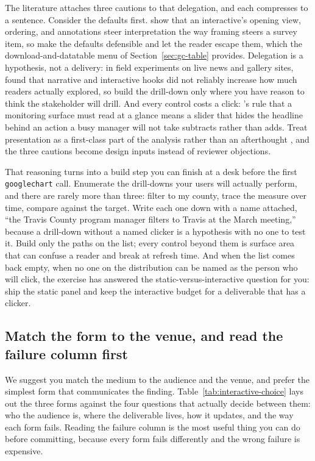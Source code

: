 \documentclass[
    a4paper,
    fontsize=10pt,
    twoside=true,
    numbers=noenddot,
]{kaobook}
\begin{document}
The literature attaches three cautions to that delegation, and each compresses to a sentence. Consider the defaults first. \textcite{hullman2011rhetoric} show that an interactive's opening view, ordering, and annotations steer interpretation the way framing steers a survey item, so make the defaults defensible and let the reader escape them, which the download-and-datatable menu of Section~\ref{sec:gc-table} provides. Delegation is a hypothesis, not a delivery: in field experiments on live news and gallery sites, \textcite{boy2015storytelling} found that narrative and interactive hooks did not reliably increase how much readers actually explored, so build the drill-down only where you have reason to think the stakeholder will drill. And every control costs a click: \textcite{few2013dashboard}'s rule that a monitoring surface must read at a glance means a slider that hides the headline behind an action a busy manager will not take subtracts rather than adds. Treat presentation as a first-class part of the analysis rather than an afterthought \parencite{kosara2013storytelling}, and the three cautions become design inputs instead of reviewer objections.

That reasoning turns into a build step you can finish at a desk before the first \texttt{googlechart} call. Enumerate the drill-downs your users will actually perform, and there are rarely more than three: filter to my county, trace the measure over time, compare against the target. Write each one down with a name attached, \enquote{the Travis County program manager filters to Travis at the March meeting,} because a drill-down without a named clicker is a hypothesis with no one to test it. Build only the paths on the list; every control beyond them is surface area that can confuse a reader and break at refresh time. And when the list comes back empty, when no one on the distribution can be named as the person who will click, the exercise has answered the static-versus-interactive question for you: ship the static panel and keep the interactive budget for a deliverable that has a clicker.

\subsection{Match the form to the venue, and read the failure column first}\label{ch10-sec:forms}
We suggest you match the medium to the audience and the venue, and prefer the simplest form that communicates the finding. Table~\ref{tab:interactive-choice} lays out the three forms against the four questions that actually decide between them: who the audience is, where the deliverable lives, how it updates, and the way each form fails. Reading the failure column is the most useful thing you can do before committing, because every form fails differently and the wrong failure is expensive.
\end{document}

